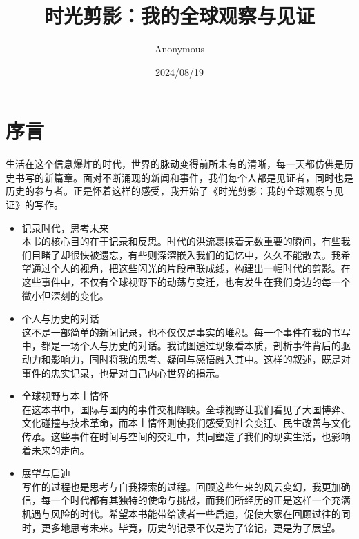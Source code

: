 \documentclass[lang=cn,newtx,10pt,scheme=chinese]{elegantbook}
\title{时光剪影：我的全球观察与见证}
\author{Anonymous}
\date{2024/08/19}
\begin{document}
\maketitle
\frontmatter

\tableofcontents

\mainmatter

\chapter{序言}

生活在这个信息爆炸的时代，世界的脉动变得前所未有的清晰，每一天都仿佛是历史书写的新篇章。面对不断涌现的新闻和事件，我们每个人都是见证者，同时也是历史的参与者。正是怀着这样的感受，我开始了《时光剪影：我的全球观察与见证》的写作。

\begin{itemize}
\item 记录时代，思考未来 \\
本书的核心目的在于记录和反思。时代的洪流裹挟着无数重要的瞬间，有些我们目睹了却很快被遗忘，有些则深深嵌入我们的记忆中，久久不能散去。我希望通过个人的视角，把这些闪光的片段串联成线，构建出一幅时代的剪影。在这些事件中，不仅有全球视野下的动荡与变迁，也有发生在我们身边的每一个微小但深刻的变化。

\item 个人与历史的对话 \\
这不是一部简单的新闻记录，也不仅仅是事实的堆积。每一个事件在我的书写中，都是一场个人与历史的对话。我试图透过现象看本质，剖析事件背后的驱动力和影响力，同时将我的思考、疑问与感悟融入其中。这样的叙述，既是对事件的忠实记录，也是对自己内心世界的揭示。

\item 全球视野与本土情怀 \\
在这本书中，国际与国内的事件交相辉映。全球视野让我们看见了大国博弈、文化碰撞与技术革命，而本土情怀则使我们感受到社会变迁、民生改善与文化传承。这些事件在时间与空间的交汇中，共同塑造了我们的现实生活，也影响着未来的走向。

\item 展望与启迪 \\
写作的过程也是思考与自我探索的过程。回顾这些年来的风云变幻，我更加确信，每一个时代都有其独特的使命与挑战，而我们所经历的正是这样一个充满机遇与风险的时代。希望本书能带给读者一些启迪，促使大家在回顾过往的同时，更多地思考未来。毕竟，历史的记录不仅是为了铭记，更是为了展望。
\end{itemize}




\end{document}
